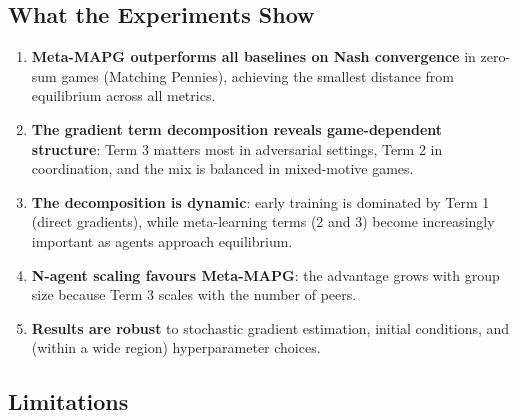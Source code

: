 \documentclass[11pt,a4paper]{article}
\begin{document}
\subsection{What the Experiments Show}

\begin{enumerate}[nosep]
\item \textbf{Meta-MAPG outperforms all baselines on Nash convergence} in zero-sum games (Matching Pennies), achieving the smallest distance from equilibrium across all metrics.
\item \textbf{The gradient term decomposition reveals game-dependent structure}: Term 3 matters most in adversarial settings, Term 2 in coordination, and the mix is balanced in mixed-motive games.
\item \textbf{The decomposition is dynamic}: early training is dominated by Term 1 (direct gradients), while meta-learning terms (2 and 3) become increasingly important as agents approach equilibrium.
\item \textbf{N-agent scaling favours Meta-MAPG}: the advantage grows with group size because Term 3 scales with the number of peers.
\item \textbf{Results are robust} to stochastic gradient estimation, initial conditions, and (within a wide region) hyperparameter choices.
\end{enumerate}

\subsection{Limitations}
\end{document}
